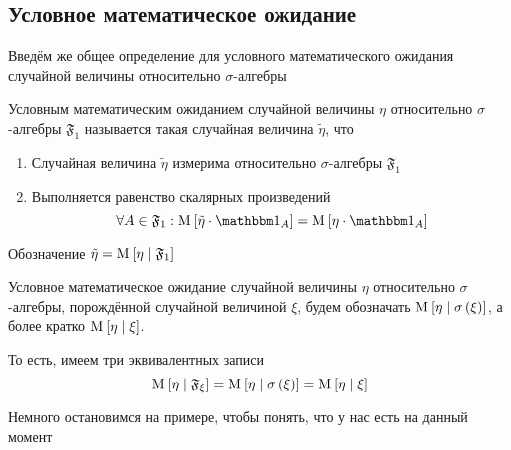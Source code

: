 \subsection{Условное математическое ожидание}
Введём же общее определение для условного математического ожидания
случайной величины относительно $\sigma$-алгебры

\begin{definition}
    Условным математическим ожиданием случайной величины $\eta$
    относительно $\sigma$-алгебры $\mathfrak{F}_1$
    называется такая случайная величина $\tilde{\eta}$, что
    \begin{enumerate}
        \item Случайная величина $\tilde{\eta}$
                измерима относительно $\sigma$-алгебры $\mathfrak{F}_1$
        \item Выполняется равенство скалярных произведений
            $$\forall A \in \mathfrak{F}_1:
                \Mean{ \tilde{\eta} \cdot \indicatorof{A} }
                    = \Mean{ \eta \cdot \indicatorof{A} }$$
    \end{enumerate}
    Обозначение $\tilde{\eta} = \mathrm{M}_{} \left[  \eta \mid \mathfrak{F}_1  \right]$

\end{definition}

\begin{remark}
    Условное математическое ожидание случайной величины $\eta$
    относительно $\sigma$-алгебры, порождённой случайной величиной $\xi$,
    будем обозначать $\mathrm{M}_{} \left[  \eta \mid \sigma\left( \xi \right)  \right]$,
    а более кратко $\mathrm{M}_{} \left[  \eta \mid \xi  \right]$.

    То есть, имеем три эквивалентных записи
    $$\mathrm{M}_{} \left[  \eta \mid \mathfrak{F}_{\xi}  \right]
        = \mathrm{M}_{} \left[  \eta \mid \sigma\left( \xi \right)  \right]
        = \mathrm{M}_{} \left[  \eta \mid \xi  \right]$$
\end{remark}

Немного остановимся на примере, чтобы понять, что у нас есть на данный момент

